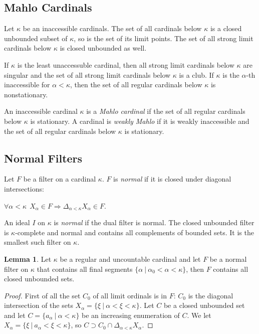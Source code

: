 \documentclass[8pt]{article}
\theoremstyle{definition}
\theoremstyle{definition}
\theoremstyle{definition}
\theoremstyle{definition}
\theoremstyle{definition}
\theoremstyle{definition}
\theoremstyle{definition}
\theoremstyle{definition}
\newtheorem{lemma}{Lemma}[section]
\theoremstyle{definition}
\theoremstyle{definition}
\theoremstyle{definition}
\theoremstyle{definition}
\theoremstyle{definition}
\theoremstyle{definition}
\theoremstyle{question}
\begin{document}
\subsection{Mahlo Cardinals}

Let $\kappa$ be an inaccessible cardinals. The set of all cardinals below $\kappa$ is a closed unbounded subset of
$\kappa$, so is the set of its limit points. The set of all strong limit cardinals below $\kappa$ is closed unbounded
as well.

If $\kappa$ is the least unaccessuble cardinal, then all strong limit cardinals below $\kappa$ are singular and
the set of all strong limit cardinals below $\kappa$ is a club. If $\kappa$ is the $\alpha$-th inaccessible 
for $\alpha < \kappa$, then the set of all regular cardinals below $\kappa$ is nonstationary.

An inaccessible cardinal $\kappa$ is a \emph{Mahlo cardinal} if the set of all regular cardinals below $\kappa$
is stationary. A cardinal is \emph{weakly Mahlo} if it is weakly inaccessible and the set of all regular cardinals below $\kappa$
is stationary.

\subsection{Normal Filters}

Let $F$ be a filter on a cardinal $\kappa$. $F$ is \emph{normal} if it is closed under diagonal intersections:
\begin{center}
  $\forall \alpha < \kappa \:\: X_{\alpha} \in F \Rightarrow \Delta_{\alpha < \kappa} X_{\alpha} \in F$.
\end{center}

An ideal $I$ on $\kappa$ is \emph{normal} if the dual filter is normal.
The closed unbounded filter is $\kappa$-complete and normal and contains all complements of bounded sets. 
It is the smallest such filter on $\kappa$.

\begin{lemma}
  Let $\kappa$ be a regular and uncountable cardinal and let $F$ be a normal filter
  on $\kappa$ that contains all final segments $\{ \alpha \: | \: \alpha_0 < \alpha < \kappa \}$, then $F$ contains 
  all closed unbounded sets.
\end{lemma}

\begin{proof}
  First of all the set $C_0$ of all limit ordinals is in $F$: $C_0$ is the diagonal intersection of the sets
  $X_{\alpha} = \{ \xi \: | \: \alpha < \xi < \kappa \}$. Let $C$ be a closed unbounded set and let 
  $C = \{ a_{\alpha} \: | \: \alpha < \kappa \}$ be an increasing enumeration of $C$. We let 
  $X_{\alpha} = \{ \xi \: | \: a_{\alpha} < \xi < \kappa \}$, so $C \supset C_0 \cap \Delta_{\alpha < \kappa} X_{\alpha}$.
\end{proof}
\end{document}
